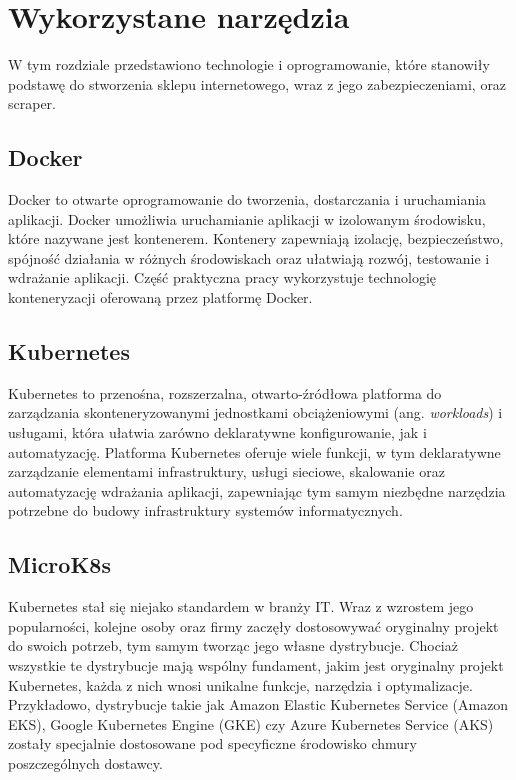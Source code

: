 \newpage

\section{Wykorzystane narzędzia}\label{sec:wykorzystane-narzedzia}

W tym rozdziale przedstawiono technologie i oprogramowanie, które stanowiły podstawę do stworzenia sklepu internetowego, wraz z jego zabezpieczeniami, oraz scraper.

\subsection{Docker}\label{subsec:docker}

Docker to otwarte oprogramowanie do tworzenia, dostarczania i uruchamiania aplikacji\cite{docker-overview}.
Docker umożliwia uruchamianie aplikacji w izolowanym środowisku, które nazywane jest kontenerem.
Kontenery zapewniają izolację, bezpieczeństwo, spójność działania w różnych środowiskach oraz ułatwiają rozwój, testowanie i wdrażanie aplikacji.
Część praktyczna pracy wykorzystuje technologię konteneryzacji oferowaną przez platformę Docker.

\subsection{Kubernetes}\label{subsec:kubernetes}

Kubernetes to przenośna, rozszerzalna, otwarto-źródłowa platforma do zarządzania skonteneryzowanymi jednostkami obciążeniowymi (ang. \emph{workloads}) i usługami, która ułatwia zarówno deklaratywne konfigurowanie, jak i automatyzację\cite{kubernetes-overview}.
Platforma Kubernetes oferuje wiele funkcji, w tym deklaratywne zarządzanie elementami infrastruktury, usługi sieciowe, skalowanie oraz automatyzację wdrażania aplikacji, zapewniając tym samym niezbędne narzędzia potrzebne do budowy infrastruktury systemów informatycznych.

\subsection{MicroK8s}\label{subsec:microk8s}

Kubernetes stał się niejako standardem w branży IT\@.
Wraz z wzrostem jego popularności, kolejne osoby oraz firmy zaczęły dostosowywać oryginalny projekt do swoich potrzeb, tym samym tworząc jego własne dystrybucje.
Chociaż wszystkie te dystrybucje mają wspólny fundament, jakim jest oryginalny projekt Kubernetes, każda z nich wnosi unikalne funkcje, narzędzia i optymalizacje.
Przykładowo, dystrybucje takie jak Amazon Elastic Kubernetes Service (Amazon EKS), Google Kubernetes Engine (GKE) czy Azure Kubernetes Service (AKS) zostały specjalnie dostosowane pod specyficzne środowisko chmury poszczególnych dostawcy.

